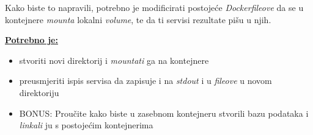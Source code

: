 \documentclass[12pt,a4paper]{article}
\begin{document}
Kako biste to napravili, potrebno je modificirati postojeće \textit{Dockerfileove} da se u kontejnere \textit{mounta} lokalni \textit{volume}, te da ti servisi rezultate pišu u njih.


\underline{\textbf{Potrebno je:}}
\begin{itemize}
	\item stvoriti novi direktorij i \textit{mountati} ga na kontejnere
	\item preusmjeriti ispis servisa da zapisuje i na \textit{stdout} i u \textit{fileove} u novom direktoriju 
	\item BONUS: Proučite kako biste u zasebnom kontejneru stvorili bazu podataka i \textit{linkali} ju s postojećim kontejnerima
\end{itemize}
\end{document}
